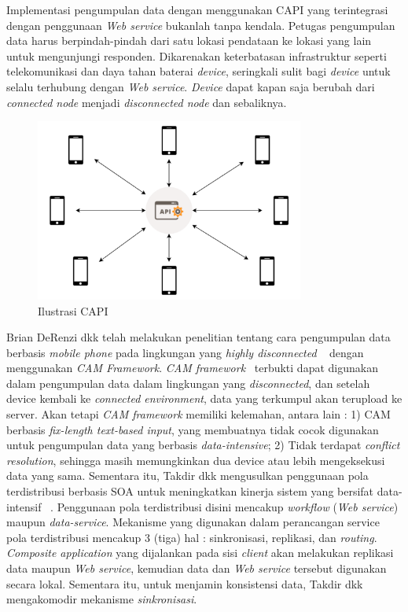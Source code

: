 Implementasi pengumpulan data dengan menggunakan CAPI yang terintegrasi dengan penggunaan \textit{Web service} bukanlah tanpa kendala. Petugas pengumpulan data harus berpindah-pindah dari satu lokasi pendataan ke lokasi yang lain untuk mengunjungi responden. Dikarenakan keterbatasan infrastruktur seperti telekomunikasi dan daya tahan baterai \textit{device}, seringkali sulit bagi \textit{device} untuk selalu terhubung dengan \textit{Web service}. \textit{Device} dapat kapan saja berubah dari \textit{connected node} menjadi \textit{disconnected node} dan sebaliknya. 

\begin{figure}
    \centering
    \includegraphics[height=6cm]{images/CAPI-Ilustration}
    \caption{Ilustrasi CAPI}
    \label{fig:capi-ilustration}
\end{figure}

Brian DeRenzi dkk telah melakukan penelitian tentang cara pengumpulan data berbasis \textit{mobile phone} pada lingkungan yang \textit{highly disconnected} ~\cite{derenzi_reliable_2007} dengan menggunakan \textit{CAM Framework}. \textit{CAM framework}~\cite{parikh_designing_2006} terbukti dapat digunakan dalam pengumpulan data dalam lingkungan yang \textit{disconnected}, dan setelah device kembali ke \textit{connected environment}, data yang terkumpul akan terupload ke server. Akan tetapi \textit{CAM framework} memiliki kelemahan, antara lain : 1) CAM berbasis \textit{fix-length text-based input}, yang membuatnya tidak cocok digunakan untuk pengumpulan data yang berbasis \textit{data-intensive}; 2) Tidak terdapat \textit{conflict resolution}, sehingga masih memungkinkan dua device atau lebih mengeksekusi data yang sama. Sementara itu, Takdir dkk mengusulkan penggunaan pola terdistribusi berbasis SOA untuk meningkatkan kinerja sistem yang bersifat data-intensif ~\cite{takdir_multi-layer_2014}. Penggunaan pola terdistribusi disini mencakup \textit{workflow} (\textit{Web service}) maupun \textit{data-service}. Mekanisme yang digunakan dalam perancangan service pola terdistribusi mencakup 3 (tiga) hal : sinkronisasi, replikasi, dan \textit{routing}. \textit{Composite application} yang dijalankan pada sisi \textit{client} akan melakukan replikasi data maupun \textit{Web service}, kemudian data dan \textit{Web service} tersebut digunakan secara lokal. Sementara itu, untuk menjamin konsistensi data, Takdir dkk mengakomodir mekanisme \textit{sinkronisasi}.

